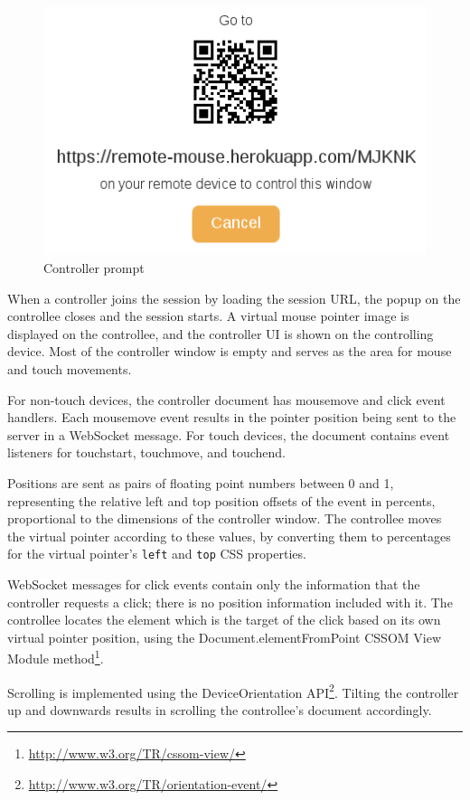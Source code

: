 \documentclass[a4paper,english,twocolumn]{article}
\begin{document}
\begin{figure}[htb]
  \begin{center}
    \includegraphics[scale=0.3]{prompt}
    \caption{Controller prompt}
  \end{center}
\end{figure}

When a controller joins the session by loading the session URL, the
popup on the controllee closes and the session starts. A virtual mouse
pointer image is displayed on the controllee, and the controller UI is
shown on the controlling device. Most of the controller window is
empty and serves as the area for mouse and touch movements.

For non-touch devices, the controller document has mousemove and click
event handlers. Each mousemove event results in the pointer position
being sent to the server in a WebSocket message. For touch devices,
the document contains event listeners for touchstart, touchmove, and
touchend.

Positions are sent as pairs of floating point numbers between 0 and 1,
representing the relative left and top position offsets of the event
in percents, proportional to the dimensions of the controller
window. The controllee moves the virtual pointer according to these
values, by converting them to percentages for the virtual pointer's
\verb!left! and \verb!top! CSS properties.

WebSocket messages for click events contain only the information that
the controller requests a click; there is no position information
included with it. The controllee locates the element which is the
target of the click based on its own virtual pointer position, using
the Document.elementFromPoint CSSOM View Module
method\footnote{\url{http://www.w3.org/TR/cssom-view/}}.

Scrolling is implemented using the DeviceOrientation
API\footnote{\url{http://www.w3.org/TR/orientation-event/}}. Tilting
the controller up and downwards results in scrolling the controllee's
document accordingly.
\end{document}
